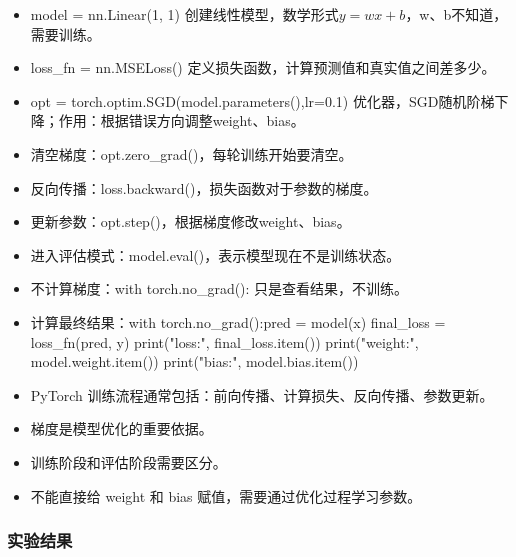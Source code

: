 \documentclass[UTF8,a4paper,11pt]{ctexart}
\begin{document}

\begin{itemize}[leftmargin=2em,itemsep=0.2em,topsep=0.3em]
    \small
    \item model = nn.Linear(1, 1) 创建线性模型，数学形式$y = wx + b$，w、b不知道，需要训练。
    \item loss\_fn = nn.MSELoss() 定义损失函数，计算预测值和真实值之间差多少。
    \item opt = torch.optim.SGD(model.parameters(),lr=0.1) 优化器，SGD随机阶梯下降；作用：根据错误方向调整weight、bias。
\end{itemize}



\begin{itemize}[leftmargin=2em,itemsep=0.2em,topsep=0.3em]
    \small
    \item 清空梯度：opt.zero\_grad()，每轮训练开始要清空。
    \item 反向传播：loss.backward()，损失函数对于参数的梯度。
    \item 更新参数：opt.step()，根据梯度修改weight、bias。
    \item 进入评估模式：model.eval()，表示模型现在不是训练状态。
    \item 不计算梯度：with torch.no\_grad(): 只是查看结果，不训练。
    \item 计算最终结果：with torch.no\_grad():pred = model(x) final\_loss = loss\_fn(pred, y) print("loss:", final\_loss.item()) print("weight:", model.weight.item()) print("bias:", model.bias.item())
\end{itemize}



\begin{itemize}[leftmargin=2em,itemsep=0.2em,topsep=0.3em]
    \small
    \item PyTorch 训练流程通常包括：前向传播、计算损失、反向传播、参数更新。
    \item 梯度是模型优化的重要依据。
    \item 训练阶段和评估阶段需要区分。
    \item 不能直接给 weight 和 bias 赋值，需要通过优化过程学习参数。
\end{itemize}


\subsubsection{实验结果}
\end{document}
